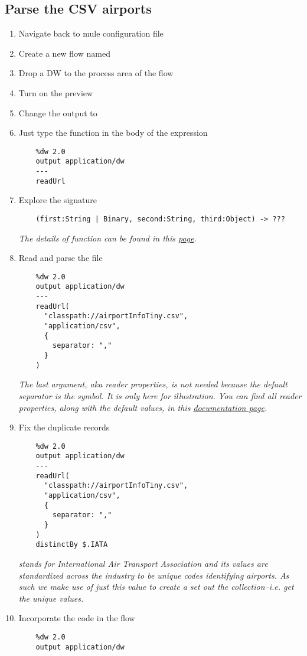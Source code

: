 \subsection{Parse the CSV airports}
\begin{enumerate}[resume*]
\item Navigate back to  mule configuration file
\item Create a new flow named 
\item Drop a DW to the process area of the flow
\item Turn on the preview
\item Change the output to 
\item Just type the function  in the body of the expression
  \begin{lstlisting}
    %dw 2.0
    output application/dw
    ---
    readUrl
  \end{lstlisting}
\item Explore the signature
  \begin{lstlisting}
    (first:String | Binary, second:String, third:Object) -> ???
  \end{lstlisting}
  \emph{
    The details of  function can be found in this \href{https://docs.mulesoft.com/mule-runtime/4.3/dw-core-functions-readurl}{page}.
  }
\item Read and parse the file
  \begin{lstlisting}
    %dw 2.0
    output application/dw
    ---
    readUrl(
      "classpath://airportInfoTiny.csv",
      "application/csv",
      {
        separator: ","
      }
    )
  \end{lstlisting}
  \emph{
    The last argument, aka reader properties, is not needed because the default separator is the \ttt{,} symbol.  It is only here for illustration.  You can find all reader properties, along with the default values, in this \href{https://docs.mulesoft.com/mule-runtime/4.3/dataweave-formats-csv\#reader-properties}{documentation page}.
  }
\item Fix the duplicate records
  \begin{lstlisting}
    %dw 2.0
    output application/dw
    ---
    readUrl(
      "classpath://airportInfoTiny.csv",
      "application/csv",
      {
        separator: ","
      }
    )
    distinctBy $.IATA
  \end{lstlisting}
  \emph{
     stands for International Air Transport Association and its values are standardized across the industry to be unique codes identifying airports.  As such we make use of just this value to create a set out the collection--i.e. get the unique values.
  }
\item Incorporate the code in the  flow
  \begin{lstlisting}
    %dw 2.0
    output application/dw


\end{lstlisting}
\end{enumerate}
